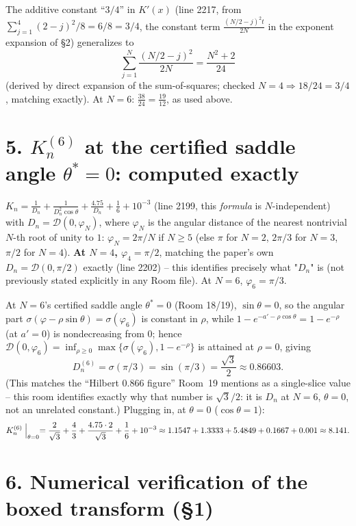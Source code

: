 \documentclass[11pt]{article}
\begin{document}
The additive constant ``$3/4$'' in $K'(x)$ (line 2217, from $\sum_{j=1}^4(2-j)^2/8=6/8=3/4$, the
constant term $\frac{(N/2-j)^2t}{2N}$ in the exponent expansion of \S2) generalizes to
\[
  \sum_{j=1}^N\frac{(N/2-j)^2}{2N}=\frac{N^2+2}{24}
\]
(derived by direct expansion of the sum-of-squares; checked $N=4\Rightarrow18/24=3/4$, matching
exactly). At $N=6$: $\frac{38}{24}=\frac{19}{12}$, as used above.

\section*{5. $K_n^{(6)}$ at the certified saddle angle $\theta^*=0$: computed exactly}

$K_n=\frac1{D_n}+\frac1{D_n^2\cos\theta}+\frac{4.75}{D_n}+\frac16+10^{-3}$ (line 2199, this
\emph{formula} is $N$-independent) with $D_n=\mathcal D(0,\varphi_N)$, where $\varphi_N$ is the
angular distance of the nearest nontrivial $N$-th root of unity to $1$: $\varphi_N=2\pi/N$ if
$N\ge5$ (else $\pi$ for $N=2$, $2\pi/3$ for $N=3$, $\pi/2$ for $N=4$). \textbf{At $N=4$,
$\varphi_4=\pi/2$}, matching the paper's own $D_n=\mathcal D(0,\pi/2)$ exactly (line 2202) -- this
identifies precisely what "$D_n$" is (not previously stated explicitly in any Room file). At
$N=6$, $\varphi_6=\pi/3$.

At $N=6$'s certified saddle angle $\theta^*=0$ (Room 18/19), $\sin\theta=0$, so the angular part
$\sigma(\varphi-\rho\sin\theta)=\sigma(\varphi_6)$ is constant in $\rho$, while
$1-e^{-a'-\rho\cos\theta}=1-e^{-\rho}$ (at $a'=0$) is nondecreasing from $0$; hence
$\mathcal D(0,\varphi_6)=\inf_{\rho\ge0}\max\{\sigma(\varphi_6),1-e^{-\rho}\}$ is attained at
$\rho=0$, giving
\[
  D_n^{(6)}=\sigma(\pi/3)=\sin(\pi/3)=\frac{\sqrt3}2\approx0.86603.
\]
(This matches the ``Hilbert $0.866$ figure'' Room~19 mentions as a single-slice value -- this room
identifies exactly why that number is $\sqrt3/2$: it is $D_n$ at $N=6$, $\theta=0$, not an
unrelated constant.) Plugging in, at $\theta=0$ ($\cos\theta=1$):
\[
  K_n^{(6)}\Bigm|_{\theta=0}=\frac2{\sqrt3}+\frac43+\frac{4.75\cdot2}{\sqrt3}+\frac16+10^{-3}
  \approx1.1547+1.3333+5.4849+0.1667+0.001\approx8.141.
\]

\section*{6. Numerical verification of the boxed transform (\S1)}
\end{document}
